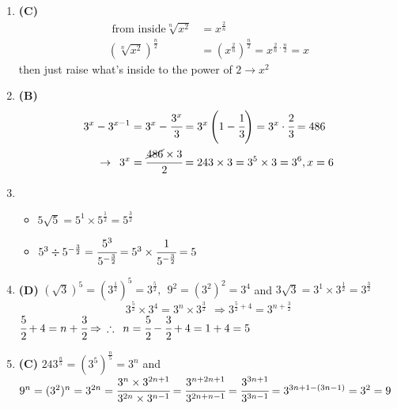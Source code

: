 \begin{multicols}{2}
\begin{enumerate}[label={\arabic*.}]
    \item \textbf{(C)}
    \begin{align*} 
    \text{ from inside}  \sqrt[n]{x^2} &= x^{\frac{2}{n}} \\
    (\sqrt[n]{x^2})^{\frac{n}{2}} & = (x^{\frac{2}{n}})^{\frac{n}{2}} = x^{\frac{2}{n} \cdot \frac{n}{2}} = x 
    \end{align*}
    then just raise what's inside to the power of $2 \rightarrow x^2$
    \item \textbf{(B)} \begin{align*} 
        3^x - 3^{x-1} &= 3^x -\cfrac{3^x}{3} = 3^x\left(1- \cfrac{1}{3}\right) =3^x \cdot \cfrac{2}{3} =  486 \\ \rightarrow \hspace{5pt}  3^x &=  \cfrac{\cancel{486}\times 3}{2} = 243 \times 3 = 3^5 \times 3 = 3^6, x = 6
    \end{align*}
    \item
    \begin{itemize} 
    \item $5\sqrt{5} = 5^1 \times 5^{\frac{1}{2}} = 5^{\frac{3}{2}}$
    \item $5^3 \div 5^{-\frac{3}{2}} = \cfrac{5^3}{5^{-\frac{3}{2}}} = 5^3 \times \cfrac{1}{5^{-\frac{3}{2}}} = 5$
    \end{itemize}

    \item \textbf{(D)} $(\sqrt{3})^5 = (3^{\frac{1}{2}})^5 = 3^{\frac{5}{2}}, \hspace{5pt} 9^2 =(3^2)^2 = 3^4  $ and $3\sqrt{3} = 3^1 \times 3^{\frac{1}{2}} = 3^{\frac{3}{2}}$ \\
        $$3^{\frac{5}{2}} \times 3^4 = 3^n \times 3^{\frac{3}{2}}\hspace{5pt} \Rightarrow 3^{\frac{5}{2} + 4} = 3^{n + \frac{3}{2}} $$ 
        $ \cfrac{5}{2} + 4 = n + \cfrac{3}{2} \Rightarrow \hspace{5pt} \therefore \hspace{5pt} n = \cfrac{5}{2} - \cfrac{3}{2} + 4 = 1 + 4 = 5  $
    \item \textbf{(C)} $243^{\frac{n}{5}} = (3^5)^{\frac{n}{5}} = 3^n$ and $9^n = (3^2)^n = 3^{2n} = \cfrac{3^n \times 3^{2n + 1}}{3^{2n} \times 3^{n-1}} = \cfrac{3^{n + 2n + 1}}{3^{2n + n -1}} = \cfrac{3^{3n + 1}}{3^{3n - 1}} = 3^{3n + 1 - (3n - 1)} = 3^2 = 9 $


\end{enumerate}
\end{multicols}
